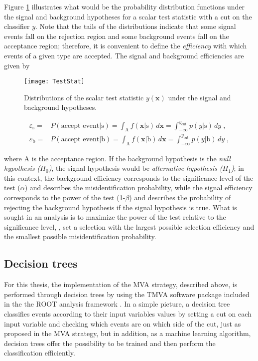 Figure \ref{fig:scalar_test} illustrates what would be the probability distribution functions under the signal and background hypotheses for a scalar test statistic with a cut on the classifier $y$.
Note that the tails of the distributions indicate that some signal events fall on the rejection region and some background events fall on the acceptance region; therefore, it is convenient to define the \textit{efficiency} with which events of a given type are accepted. The signal and background efficiencies are given by 

\begin{figure}[!h]
  \centering
  \texttt{[image: TestStat]}
  \caption[Scalar test statistical.]{Distributions of the scalar test statistic $y(\textbf{x})$ under the signal and background hypotheses.\cite{mva}}\label{fig:scalar_test}
\end{figure}

\begin{align}
\label{eq:sigeff}
\varepsilon_{\textrm{s}}  = & P( \mbox{accept event} | \mbox{s} ) = \int_{\textrm{A}} f(\textbf{x} | \mbox{s} ) \, d \textbf{x} = \int_{-\infty}^{y_{\textrm{cut}}} p(y | \mbox{s}) \, dy\;, \\
\varepsilon_{\textrm{b}}  = & P( \mbox{accept event} | \mbox{b} ) = \int_{\textrm{A}} f(\textbf{x} | \mbox{b} ) \, d \textbf{x} = \int_{-\infty}^{y_{\textrm{cut}}} p(y | \mbox{b}) \, dy \;,
\end{align}

\noindent where A is the acceptance region. If the background hypothesis is the \textit{null hypothesis ($H_0$)}, the signal hypothesis would be \textit{alternative hypothesis ($H_1$)}; in this context, the background efficiency corresponds to the significance level of the test ($\alpha$) and describes the misidentification probability, while the signal efficiency corresponds to the power of the test (1-$\beta$) and describes the probability of rejecting the background hypothesis if the signal hypothesis is true. What is sought in an analysis is to maximize the power of the test relative to the significance level, \ie, set a selection with the largest possible selection efficiency and the smallest possible misidentification probability.

\subsection{Decision trees }

For this thesis, the implementation of the MVA strategy, described above, is performed through decision trees by using the TMVA software package \cite{tmva} included in the the ROOT analysis framework \cite{root}. In a simple picture, a decision tree classifies events according to their input variables values by setting a cut on each input variable and checking which events are on which side of the cut, just as proposed in the MVA strategy, but in addition, as a machine learning algorithm, decision trees offer the possibility to be trained and then perform the classification efficiently.   

